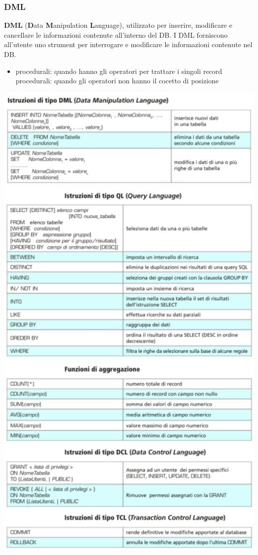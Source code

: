 \documentclass{article}
\begin{document}
\subsubsection{DML}
 \textbf{DML} (\textbf{D}ata \textbf{M}anipulation \textbf{L}anguage), utilizzato per inserire, modificare e cancellare le informazioni contenute all'interno del DB. I DML forniscono all'utente uno strument per interrogare e modificare le informazioni contenute nel DB.
 \begin{itemize}
     \item procedurali: quando hanno gli operatori per trattare i singoli record
     \itemnon procedurali: quando gli operatori non hanno il cocetto di posizione
 \end{itemize}
\includegraphics[scale=1.6]{dml.PNG}
\\
\includegraphics[scale=1.6]{comandi.PNG}
\end{document}
